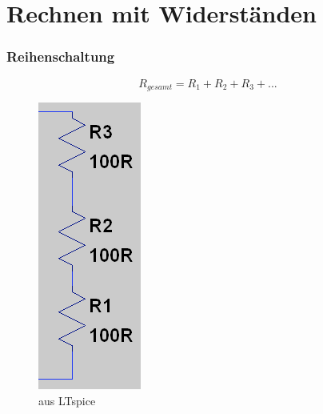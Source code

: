 \section*{Rechnen mit Widerständen}

\begin{frame}
    \frametitle{Reihenschaltung}
        
    $$R_{gesamt} = R_1 + R_2 + R_3 + ...$$

	\begin{center}
        \begin{figure}
        \includegraphics[width=.4\textwidth,height=.75\textheight,keepaspectratio]{e04/Reihe.png}
        \caption{aus LTspice}
      \end{figure}
    \end{center}
\end{frame}

